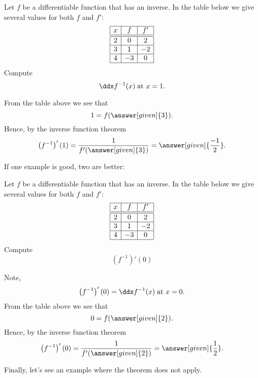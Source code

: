 \documentclass{ximera}
\begin{document}
\begin{example}
  Let $f$ be a differentiable function that has an inverse. In the
  table below we give several values for both $f$ and $f'$:
  \[
  \begin{array}{|c|c|c|}\hline
    x & f  & f' \\ \hline \hline
    2 & 0  & 2  \\ \hline
    3 & 1  & -2 \\ \hline
    4 & -3 & 0  \\ \hline
  \end{array}
  \]
  Compute
  \[
  \ddx f^{-1}(x)\;\text{at $x=1$.}
  \]
  \begin{explanation}
    From the table above we see that
    \[
    1 = f(\answer[given]{3}).
    \]
    Hence, by the inverse function theorem
    \[
    \left(f^{-1}\right)' (1)= \frac{1}{f'(\answer[given]{3})} = \answer[given]{\frac{-1}{2}}.
    \]
  \end{explanation}
\end{example}

If one example is good, two are better:

\begin{example}
  Let $f$ be a differentiable function that has an inverse. In the
  table below we give several values for both $f$ and $f'$:
  \[
  \begin{array}{|c|c|c|}\hline
    x & f  & f' \\ \hline \hline
    2 & 0  & 2  \\ \hline
    3 & 1  & -2 \\ \hline
    4 & -3 & 0  \\ \hline
  \end{array}
  \]
  Compute
  \[
  \left(f^{-1}\right)'(0)
  \]
  \begin{explanation}
    Note,
    \[
    \left(f^{-1}\right)'(0) = \ddx f^{-1}(x)\;\text{at $x=0$.}
    \]
    From the table above we see that
    \[
    0 = f(\answer[given]{2}).
    \]
    Hence, by the inverse function theorem
    \[
    \left(f^{-1}\right)'(0) = \frac{1}{f'(\answer[given]{2})} = \answer[given]{\frac{1}{2}}.
    \]
  \end{explanation}
\end{example}

Finally, let's see an example where the theorem does not apply.
\end{document}
